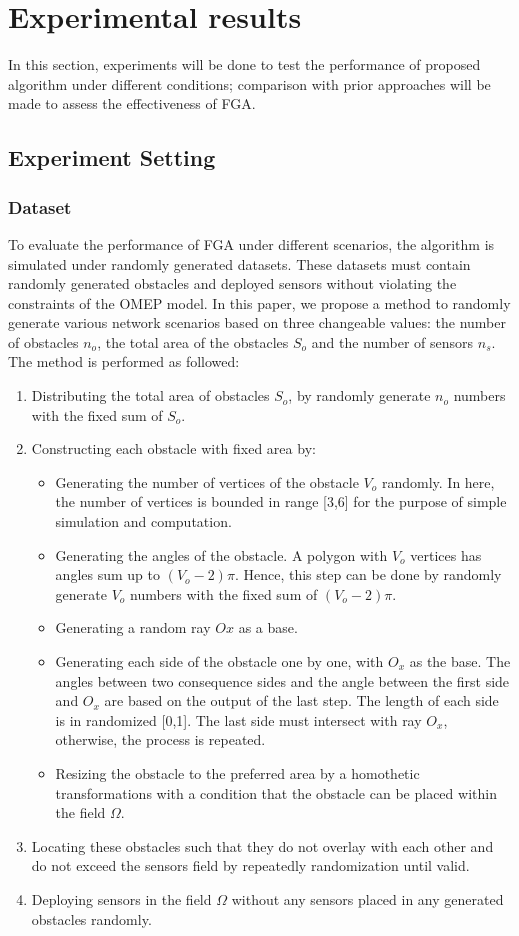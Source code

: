 \documentclass[final]{elsarticle}
\begin{document}
\section{Experimental results}
In this section, experiments will be done to test the performance of proposed algorithm under different conditions; comparison with prior approaches will be made to assess the effectiveness of FGA. 
\subsection{Experiment Setting}
\subsubsection{Dataset}
To evaluate the performance of FGA under different scenarios, the algorithm is simulated under randomly generated datasets. These datasets must contain randomly generated obstacles and deployed sensors without violating the constraints of the OMEP model. In this paper, we propose a method to randomly generate various network scenarios based on three changeable values: the number of obstacles $n_o$, the total area of the obstacles $S_o$ and the number of sensors $n_s$. The method is performed as followed: 

\begin{enumerate}
	\item Distributing the total area of obstacles $S_o$, by randomly generate $n_o$ numbers with the fixed sum of $S_o$.
	\item Constructing each obstacle with fixed area by:
	\begin{itemize}
		\item Generating the number of vertices of the obstacle $V_o$ randomly. In here, the number of vertices is bounded in range [3,6] for the purpose of simple simulation and computation. 
		\item Generating the angles of the obstacle. A polygon with $V_o$ vertices has angles sum up to $(V_o - 2)\pi$. Hence, this step can be done by randomly generate $V_o$ numbers with the fixed sum of $(V_o - 2)\pi$.
		\item Generating a random ray $Ox$ as a base.
		\item Generating each side of the obstacle one by one, with $O_x$ as the base. The angles between two consequence sides and the angle between the first side and $O_x$ are based on the output of the last step. The length of each side is in randomized [0,1]. The last side must intersect with ray $O_x$, otherwise, the process is repeated.
		\item Resizing the obstacle to the preferred area by a homothetic transformations with a condition that the obstacle can be placed within the field $\Omega$.
	\end{itemize}
	\item Locating these obstacles such that they do not overlay with each other and do not exceed the sensors field by repeatedly randomization until valid.
	\item Deploying sensors in the field $\Omega$ without any sensors placed in any generated obstacles randomly.
\end{enumerate}
\end{document}
